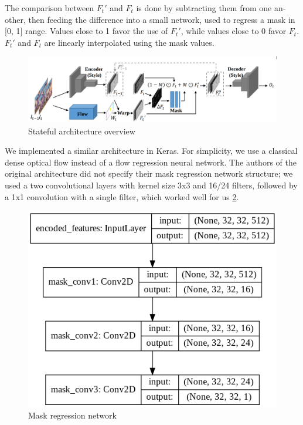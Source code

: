 \documentclass[12pt,openright,oneside,a4paper,english]{abntex2}
\begin{document}
\begin{otherlanguage}{english}
The comparison between $F_t'$ and $F_t$ is done by subtracting them from one another, then feeding the difference into a small network, used to regress a mask in [0, 1] range. Values close to 1 favor the use of $F_t'$, while values close to 0 favor $F_t$. $F_t'$ and $F_t$ are linearly interpolated using the mask values.

\begin{figure}[!htb]
\centering
\includegraphics[width=\textwidth]{optical_flow_arch}
\caption{Stateful architecture overview \cite{MSFT_transfer}}
\label{optical_flow_arch}
\end{figure}

We implemented a similar architecture in Keras. For simplicity, we use a classical dense optical flow instead of a flow regression neural network. The authors of the original architecture did not specify their mask regression network structure; we used a two convolutional layers with kernel size 3x3 and 16/24 filters, followed by a 1x1 convolution with a single filter, which worked well for us \ref{mask_net}.

\begin{figure}[!htb]
\centering
\includegraphics[width=\textwidth/2]{mask_network}
\caption{Mask regression network}
\label{mask_net}
\end{figure}


\end{otherlanguage}
\end{document}
